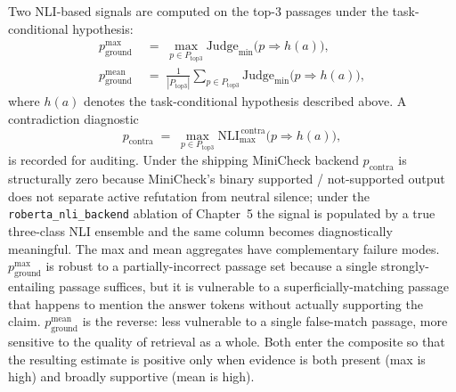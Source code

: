 Two NLI-based signals are computed on the top-3 passages under the task-conditional hypothesis:
\begin{align}
p_{\text{ground}}^{\max} &\;=\; \max_{p \in P_{\text{top3}}} \mathrm{Judge}_{\min}\bigl(p \Rightarrow h(a)\bigr),
\label{eq:pgmax}\\
p_{\text{ground}}^{\text{mean}} &\;=\; \frac{1}{|P_{\text{top3}}|}\sum_{p \in P_{\text{top3}}} \mathrm{Judge}_{\min}\bigl(p \Rightarrow h(a)\bigr),
\label{eq:pgmean}
\end{align}
where $h(a)$ denotes the task-conditional hypothesis described above. A contradiction diagnostic
\begin{equation}
p_{\text{contra}} \;=\; \max_{p \in P_{\text{top3}}} \mathrm{NLI}_{\max}^{\,\text{contra}}\bigl(p \Rightarrow h(a)\bigr),
\label{eq:pcontra}
\end{equation}
is recorded for auditing. Under the shipping MiniCheck backend $p_{\text{contra}}$ is structurally zero because MiniCheck's binary supported / not-supported output does not separate active refutation from neutral silence; under the \texttt{roberta\_nli\_backend} ablation of Chapter~5 the signal is populated by a true three-class NLI ensemble and the same column becomes diagnostically meaningful. The max and mean aggregates have complementary failure modes. $p_{\text{ground}}^{\max}$ is robust to a partially-incorrect passage set because a single strongly-entailing passage suffices, but it is vulnerable to a superficially-matching passage that happens to mention the answer tokens without actually supporting the claim. $p_{\text{ground}}^{\text{mean}}$ is the reverse: less vulnerable to a single false-match passage, more sensitive to the quality of retrieval as a whole. Both enter the composite so that the resulting estimate is positive only when evidence is both present (max is high) and broadly supportive (mean is high).

